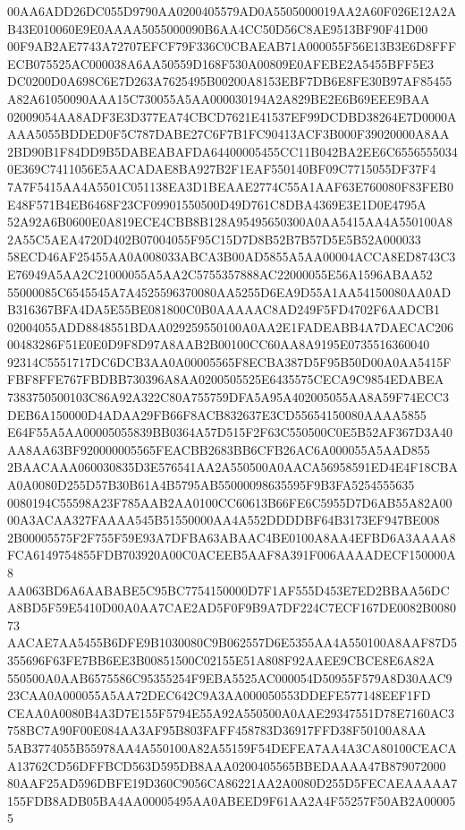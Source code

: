 \documentclass[UTF8,fontset=fandol,zihao=-4,a4paper]{ctexart}
\begin{document}
{{00AA6ADD26DC055D9790AA0200405579AD0A5505000019AA2A60F026E12A2AB43E010060E9E0AAAA5055000090B6AA4CC50D56C8AE9513BF90F41D00
00F9AB2AE7743A72707EFCF79F336C0CBAEAB71A000055F56E13B3E6D8FFFECB075525AC000038A6AA50559D168F530A00809E0AFEBE2A5455BFF5E3
DC0200D0A698C6E7D263A7625495B00200A8153EBF7DB6E8FE30B97AF85455A82A61050090AAA15C730055A5AA000030194A2A829BE2E6B69EEE9BAA
02009054AA8ADF3E3D377EA74CBCD7621E41537EF99DCDBD38264E7D0000AAAA5055BDDED0F5C787DABE27C6F7B1FC90413ACF3B000F39020000A8AA
2BD90B1F84DD9B5DABEABAFDA64400005455CC11B042BA2EE6C65565550340E369C7411056E5AACADAE8BA927B2F1EAF550140BF09C7715055DF37F4
7A7F5415AA4A5501C051138EA3D1BEAAE2774C55A1AAF63E760080F83FEB0E48F571B4EB6468F23CF09901550500D49D761C8DBA4369E3E1D0E4795A
52A92A6B0600E0A819ECE4CBB8B128A95495650300A0AA5415AA4A550100A82A55C5AEA4720D402B07004055F95C15D7D8B52B7B57D5E5B52A000033
58ECD46AF25455AA0A008033ABCA3B00AD5855A5AA00004ACCA8ED8743C3E76949A5AA2C21000055A5AA2C5755357888AC22000055E56A1596ABAA52
55000085C6545545A7A4525596370080AA5255D6EA9D55A1AA54150080AA0ADB316367BFA4DA5E55BE081800C0B0AAAAAC8AD249F5FD4702F6AADCB1
02004055ADD8848551BDAA029259550100A0AA2E1FADEABB4A7DAECAC20600483286F51E0E0D9F8D97A8AAB2B00100CC60AA8A9195E0735516360040
92314C5551717DC6DCB3AA0A00005565F8ECBA387D5F95B50D00A0AA5415FFBF8FFE767FBDBB730396A8AA0200505525E6435575CECA9C9854EDABEA
7383750500103C86A92A322C80A755759DFA5A95A402005055AA8A59F74ECC3DEB6A150000D4ADAA29FB66F8ACB832637E3CD55654150080AAAA5855
E64F55A5AA00005055839BB0364A57D515F2F63C550500C0E5B52AF367D3A40AA8AA63BF920000005565FEACBB2683BB6CFB26AC6A000055A5AAD855
2BAACAAA060030835D3E576541AA2A550500A0AACA56958591ED4E4F18CBAA0A0080D255D57B30B61A4B5795AB55000098635595F9B3FA5254555635
0080194C55598A23F785AAB2AA0100CC60613B66FE6C5955D7D6AB55A82A0000A3ACAA327FAAAA545B51550000AA4A552DDDDBF64B3173EF947BE008
2B00005575F2F755F59E93A7DFBA63ABAAC4BE0100A8AA4EFBD6A3AAAA8FCA6149754855FDB703920A00C0ACEEB5AAF8A391F006AAAADECF150000A8
AA063BD6A6AABABE5C95BC7754150000D7F1AF555D453E7ED2BBAA56DCA8BD5F59E5410D00A0AA7CAE2AD5F0F9B9A7DF224C7ECF167DE0082B008073
AACAE7AA5455B6DFE9B1030080C9B062557D6E5355AA4A550100A8AAF87D5355696F63FE7BB6EE3B00851500C02155E51A808F92AAEE9CBCE8E6A82A
550500A0AAB6575586C95355254F9EBA5525AC000054D50955F579A8D30AAC923CAA0A000055A5AA72DEC642C9A3AA000050553DDEFE577148EEF1FD
CEAA0A0080B4A3D7E155F5794E55A92A550500A0AAE29347551D78E7160AC3758BC7A90F00E084AA3AF95B803FAFF458783D36917FFD38F50100A8AA
5AB3774055B55978AA4A550100A82A55159F54DEFEA7AA4A3CA80100CEACAA13762CD56DFFBCD563D595DB8AAA0200405565BBEDAAAA47B879072000
80AAF25AD596DBFE19D360C9056CA86221AA2A0080D255D5FECAEAAAAA7155FDB8ADB05BA4AA00005495AA0ABEED9F61AA2A4F55257F50AB2A000055
}}
\end{document}
